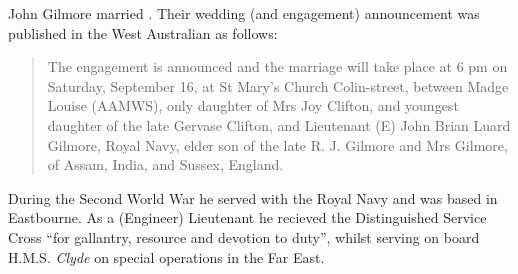 
John Gilmore married . Their wedding (and engagement) announcement was published in the West Australian as follows:\cite{GilmoreEngagement1944}

\begin{quotation}
The engagement is announced and the marriage will take place at 6 pm on Saturday, September 16, at St Mary's Church Colin-street, between Madge Louise (AAMWS), only daughter of Mrs Joy Clifton, and youngest daughter of the late Gervase Clifton, and Lieutenant (E) John Brian Luard Gilmore, Royal Navy, elder son of the late R. J. Gilmore and Mrs Gilmore, of Assam, India, and Sussex, England.
\end{quotation}

During the Second World War he served with the Royal Navy and was based in Eastbourne. As a (Engineer) Lieutenant he recieved the Distinguished Service Cross ``for gallantry, resource and devotion to duty'', whilst serving on board H.M.S. \emph{Clyde} on special operations in the Far East.\cite{LondonGazette1945}

